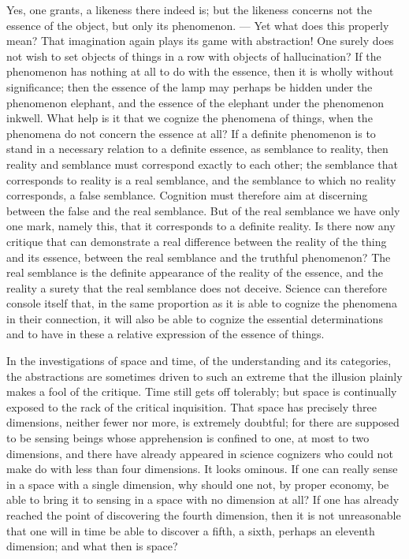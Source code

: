 \documentclass[12pt]{book}
\begin{document}
Yes, one grants, a likeness there indeed is; but the likeness concerns not the
essence of the object, but only its phenomenon. --- Yet what does this properly
mean? That imagination again plays its game with abstraction! One surely does
not wish to set objects of things in a row with objects of hallucination? If the
phenomenon has nothing at all to do with the essence, then it is wholly
without significance; then the essence of the lamp may perhaps be hidden under
the phenomenon elephant, and the essence of the elephant under the phenomenon
inkwell. What help is it that we cognize the phenomena of things, when the
phenomena do not concern the essence at all? If a definite phenomenon is to
stand in a necessary relation to a definite essence, as semblance to reality,
then reality and semblance must correspond exactly to each other; the semblance
that corresponds to reality is a real semblance, and the semblance to which no
reality corresponds, a false semblance. Cognition must therefore aim at
discerning between the false and the real semblance. But of the real semblance
we have only one mark, namely this, that it corresponds to a definite reality.
Is there now any critique that can demonstrate a real difference between the
reality of the thing and its essence, between the real semblance and the
truthful phenomenon? The real semblance is the definite appearance of the
reality of the essence, and the reality a surety that the real semblance does
not deceive. Science can therefore console itself that, in the same proportion
as it is able to cognize the phenomena in their connection, it will also be
able to cognize the essential determinations and to have in these a relative
expression of the essence of things.

In the investigations of space and time, of the understanding and its
categories, the abstractions are sometimes driven to such an extreme that the
illusion plainly makes a fool of the critique. Time still gets off tolerably;
but space is continually exposed to the rack of the critical inquisition. That
space has precisely three dimensions, neither fewer nor more, is extremely
doubtful; for there are supposed to be sensing beings whose apprehension is
confined to one, at most to two dimensions, and there have already appeared in
science cognizers who could not make do with less than four dimensions. It
looks ominous. If one can really sense in a space with a single dimension, why
should one not, by proper economy, be able to bring it to sensing in a space
with no dimension at all? If one has already reached the point of discovering
the fourth dimension, then it is not unreasonable that one will in time be able
to discover a fifth, a sixth, perhaps an eleventh dimension; and what then is
space?
\end{document}
